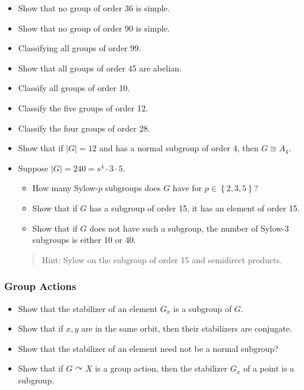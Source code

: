 \begin{itemize}
\tightlist
\item
  Show that no group of order 36 is simple.
\item
  Show that no group of order 90 is simple.
\item
  Classifying all groups of order 99.
\item
  Show that all groups of order 45 are abelian.
\item
  Classify all groups of order 10.
\item
  Classify the five groups of order 12.
\item
  Classify the four groups of order 28.
\item
  Show that if \({\left\lvert {G} \right\rvert} = 12\) and has a normal
  subgroup of order 4, then \(G \cong A_4\).
\item
  Suppose
  \({\left\lvert {G} \right\rvert} = 240 = s^4 \cdot 3 \cdot 5\).

  \begin{itemize}
  \tightlist
  \item
    How many Sylow-\(p\) subgroups does \(G\) have for
    \(p\in \left\{{2, 3, 5}\right\}\)?
  \item
    Show that if \(G\) has a subgroup of order 15, it has an element of
    order 15.
  \item
    Show that if \(G\) does not have such a subgroup, the number of
    Sylow-\(3\) subgroups is either 10 or 40.
  \end{itemize}

  \begin{quote}
  Hint: Sylow on the subgroup of order 15 and semidirect products.
  \end{quote}
\end{itemize}

\hypertarget{group-actions}{%
\subsubsection{Group Actions}\label{group-actions}}

\begin{itemize}
\tightlist
\item
  Show that the stabilizer of an element \(G_x\) is a subgroup of \(G\).
\item
  Show that if \(x, y\) are in the same orbit, then their stabilizers
  are conjugate.
\item
  Show that the stabilizer of an element need not be a normal subgroup?
\item
  Show that if \(G \curvearrowright X\) is a group action, then the
  stabilizer \(G_x\) of a point is a subgroup.
\end{itemize}

